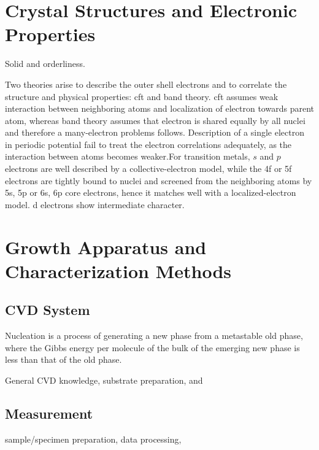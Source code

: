 \section{Crystal Structures and Electronic Properties}

Solid and orderliness.




Two theories arise to describe the outer shell electrons and to correlate the structure and physical properties: \gls{cft} and band theory.\cite{Goodenough1971} \gls{cft} assumes weak interaction between neighboring atoms and localization of electron towards parent atom, whereas band theory assumes that electron is shared equally by all nuclei and therefore a many-electron problems follows. Description of a single electron in periodic potential fail to treat the electron correlations adequately, as the interaction between atoms becomes weaker.For transition metals, $s$ and $p$ electrons are well described by a collective-electron model, while the 4f or 5f electrons are tightly bound to nuclei and screened from the neighboring atoms by 5s, 5p or 6s, 6p core electrons, hence it matches well with a localized-electron model. d electrons show intermediate character.

\section{Growth Apparatus and Characterization Methods}
\subsection{CVD System}



Nucleation is a process of generating a new phase from a metastable old phase, where the Gibbs energy per molecule of the bulk of the emerging new phase is less than that of the old phase.

  General CVD knowledge, substrate preparation, and\cite{MichealK.Zuraw2003}

\subsection{Measurement}
sample/specimen preparation, data processing,




